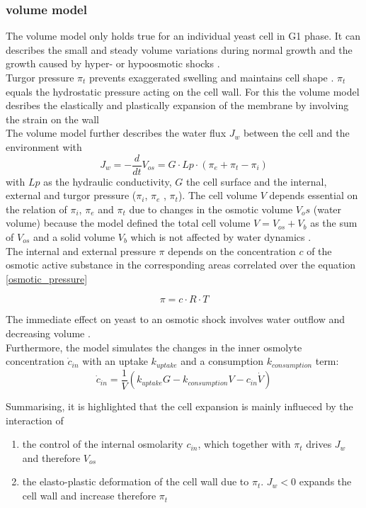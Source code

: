 \subsubsection{volume model}
The volume model only holds true for an individual yeast cell in G1 phase. It can describes the small and steady volume variations during normal growth and the growth caused by hyper- or hypoosmotic shocks \cite{volumeModel}.\\
Turgor pressure $\pi_t$ prevents exaggerated swelling and maintains cell shape \cite{volumeModel}. $\pi_t$ equals the hydrostatic pressure acting on the cell wall. For this the volume model desribes the elastically and plastically expansion of the membrane by involving the strain on the wall\\
The volume model further describes the water flux $J_w$ between the cell and the environment with 
\begin{equation}\label{waterFlux}
	J_{w} = - \frac{d}{dt} V_{os} = G \cdot Lp \cdot (\pi_e + \pi_t - \pi_i)
\end{equation}
with $Lp$ as the hydraulic conductivity, $G$ the cell surface and the internal, external and turgor pressure  ($\pi_i$, $\pi_e$ , $\pi_t$). 
The cell volume $V$ depends essential on the relation of $\pi_i$, $\pi_e$ and $\pi_t$ due to changes in the osmotic volume $V_os$ (water volume) because the model defined the total cell volume $V = V_{os} + V_b$ as the sum of $V_{os}$ and a solid volume $V_b$ which is not affected by water dynamics \cite{volumeModel}. \\ 
The internal and external pressure $\pi$ depends on the concentration $c$ of the osmotic active substance in the corresponding areas correlated over the equation \ref{osmotic_pressure}

\begin{equation} \label{osmotic_pressure}
	\pi = c \cdot R \cdot T	
\end{equation} 

The immediate effect on yeast to an osmotic shock involves water outflow and decreasing volume \cite{ASimpleMathematicalModel}.\\ 
Furthermore, the model simulates the changes in the inner osmolyte concentration $\dot c_{in}$ with an uptake $k_{uptake}$ and a consumption $k_{consumption}$ term:
\begin{equation*}
	\dot c_{in} = \frac{1}{V}(k_{uptake}G - k_{consumption}V-c_{in} \dot V)
\end{equation*}

Summarising, it is highlighted that the cell expansion is mainly influeced by the interaction of
\begin{enumerate}
	\item the control of the internal osmolarity $c_{in}$, which together with $\pi_t$ drives $J_w$ and therefore $V_{os}$
	\item the elasto-plastic deformation of the cell wall due to $\pi_t$. $J_w < 0$ expands the cell wall and increase therefore $\pi_t$
\end{enumerate}

